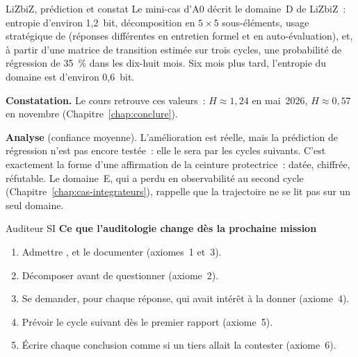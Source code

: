 \begin{boxlecture}{LiZbiZ, prédiction et constat}
Le mini-cas d'A0 décrit le domaine~D de LiZbiZ~: entropie d'environ
1,2~bit, décomposition en $5 \times 5$ sous-éléments, usage stratégique de
\NEK{} (réponses différentes en entretien formel et en auto-évaluation),
et, à partir d'une matrice de transition estimée sur trois cycles, une
probabilité de régression de 35~\% dans les dix-huit mois. Six mois plus
tard, l'entropie du domaine est d'environ 0,6~bit.

\medskip
\textbf{Constatation.} Le cours retrouve ces valeurs~: $H \approx 1{,}24$
en mai~2026, $H \approx 0{,}57$ en novembre (Chapitre~\ref{chap:conclure}).

\medskip
\textbf{Analyse} (confiance moyenne). L'amélioration est réelle, mais la
prédiction de régression n'est pas encore testée~: elle le sera par les
cycles suivants. C'est exactement la forme d'une affirmation de la
ceinture protectrice~: datée, chiffrée, réfutable. Le domaine~E, qui a
perdu en observabilité au second cycle (Chapitre~\ref{chap:cas-integrateurs}),
rappelle que la trajectoire ne se lit pas sur un seul domaine.

\medskip
\hfill{}
\end{boxlecture}

\begin{boxmetier}{Auditeur SI}
\textbf{Ce que l'auditologie change dès la prochaine mission}
\begin{enumerate}
    \item Admettre \NEK{}, et le documenter (axiomes~1 et~3).
    \item Décomposer avant de questionner (axiome~2).
    \item Se demander, pour chaque réponse, qui avait intérêt à la donner
          (axiome~4).
    \item Prévoir le cycle suivant dès le premier rapport (axiome~5).
    \item Écrire chaque conclusion comme si un tiers allait la contester
          (axiome~6).
\end{enumerate}
\end{boxmetier}


\separateur

